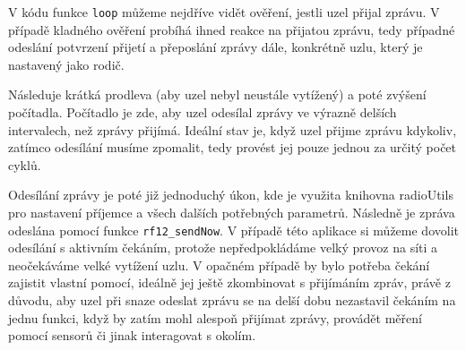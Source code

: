 \documentclass[12pt,titlepage]{article}
\begin{document}
V kódu funkce \texttt{loop} můžeme nejdříve vidět ověření, jestli uzel přijal zprávu. V případě kladného ověření probíhá ihned reakce na přijatou zprávu, tedy případné odeslání potvrzení přijetí a přeposlání zprávy dále, konkrétně uzlu, který je nastavený jako rodič. 

Následuje krátká prodleva (aby uzel nebyl neustále vytížený) a poté zvýšení počítadla. Počítadlo je zde, aby uzel odesílal zprávy ve výrazně delších intervalech, než zprávy přijímá. Ideální stav je, když uzel přijme zprávu kdykoliv, zatímco odesílání musíme zpomalit, tedy provést jej pouze jednou za určitý počet cyklů. 

Odesílání zprávy je poté již jednoduchý úkon, kde je využita knihovna radioUtils pro nastavení příjemce a všech dalších potřebných parametrů. Následně je zpráva odeslána pomocí funkce \texttt{rf12\_sendNow}. V případě této aplikace si můžeme dovolit odesílání s aktivním čekáním, protože nepředpokládáme velký provoz na síti a neočekáváme velké vytížení uzlu. V opačném případě by bylo potřeba čekání zajistit vlastní pomocí, ideálně jej ještě zkombinovat s přijímáním zpráv, právě z důvodu, aby uzel při snaze odeslat zprávu se na delší dobu nezastavil čekáním na jednu funkci, když by zatím mohl alespoň přijímat zprávy, provádět měření pomocí sensorů či jinak interagovat s okolím. 
\end{document}
